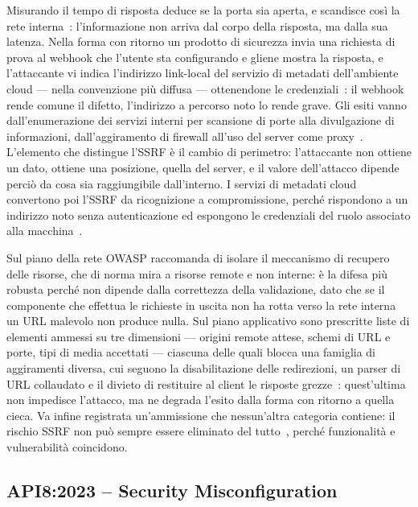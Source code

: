Misurando il tempo di risposta deduce se la porta sia aperta, e scandisce così
la rete interna~\cite{owasp2023api7}: l'informazione non arriva dal corpo della
risposta, ma dalla sua latenza. Nella forma con ritorno un prodotto di
sicurezza invia una richiesta di prova al webhook che l'utente sta configurando
e gliene mostra la risposta, e l'attaccante vi indica l'indirizzo link-local del servizio di metadati
dell'ambiente cloud ---  nella
convenzione più diffusa --- ottenendone le credenziali~\cite{owasp2023api7}: il
webhook rende comune il difetto, l'indirizzo a percorso noto lo rende grave. Gli esiti vanno dall'enumerazione dei servizi interni per scansione di
porte alla divulgazione di informazioni, dall'aggiramento di firewall all'uso
del server come proxy~\cite{owasp2023api7}. L'elemento che distingue l'SSRF è
il cambio di perimetro: l'attaccante non ottiene un dato, ottiene una
posizione, quella del server, e il valore dell'attacco dipende perciò da cosa
sia raggiungibile dall'interno. I servizi di metadati cloud convertono poi
l'SSRF da ricognizione a compromissione, perché rispondono a un indirizzo noto
senza autenticazione ed espongono le credenziali del ruolo associato alla
macchina~\cite{cwe918}.

Sul piano della rete OWASP raccomanda di isolare il meccanismo di recupero
delle risorse, che di norma mira a risorse remote e non interne: è la difesa
più robusta perché non dipende dalla correttezza della validazione, dato che se
il componente che effettua le richieste in uscita non ha rotta verso la rete
interna un URL malevolo non produce nulla. Sul piano applicativo sono
prescritte liste di elementi ammessi su tre dimensioni --- origini remote
attese, schemi di URL e porte, tipi di media accettati --- ciascuna delle quali
blocca una famiglia di aggiramenti diversa, cui seguono la disabilitazione
delle redirezioni, un parser di URL collaudato e il divieto di restituire al
client le risposte grezze~\cite{owasp2023api7}: quest'ultima non impedisce
l'attacco, ma ne degrada l'esito dalla forma con ritorno a quella cieca. Va
infine registrata un'ammissione che nessun'altra categoria contiene: il rischio
SSRF non può sempre essere eliminato del tutto~\cite{owasp2023api7}, perché
funzionalità e vulnerabilità coincidono.

\subsection{API8:2023 -- Security Misconfiguration}
\label{subsubsec:api8}

